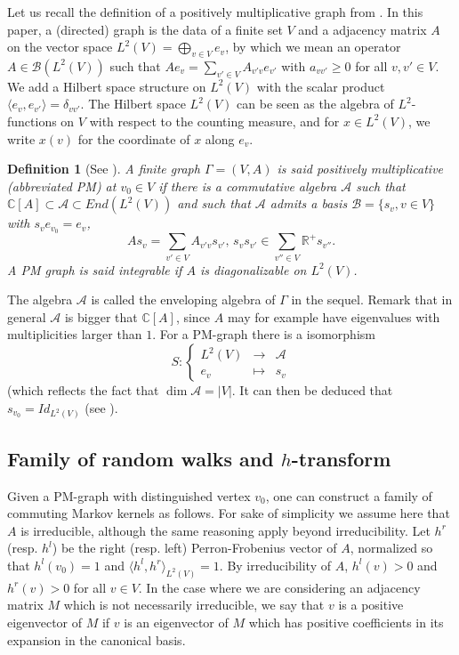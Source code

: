 \documentclass[10pt,11pt]{amsart}%
\newtheorem{definition}[theorem]{Definition}
\begin{document}
Let us recall the definition of a positively multiplicative graph from \cite{GLT}. In this paper, a (directed) graph is the data of a finite set $V$ and a adjacency matrix $A$ on the vector space $L^2(V)=\bigoplus_{v\in V} e_v$, by which we mean an operator $A\in\mathcal{B}(L^2(V))$ such that $Ae_v=\sum_{v'\in V}A_{v'v}e_{v'}$ with $a_{vv'}\geq 0$ for all $v,v'\in V$. We add a Hilbert space structure on $L^2(V)$ with the scalar product $\langle e_v,e_{v'}\rangle=\delta_{vv'}$. The Hilbert space $L^2(V)$ can be seen as the algebra of $L^2$-functions on $V$ with respect to the counting measure, and for $x\in L^2(V)$, we write $x(v)$ for the coordinate of $x$ along $e_v$.
\begin{definition} [See \cite{GLT}]\label{def:PM-graph}
A finite graph $\Gamma=(V,A)$ is said positively multiplicative (abbreviated PM) at $v_0\in V$ if there is a commutative algebra $\mathcal{A}$ such that $\mathbb{C}[A]\subset \mathcal{A}\subset End(L^2(V))$ and such that $\mathcal{A}$ admits a basis $\mathcal{B}=\{s_v,v\in V\}$ with $s_{v}e_{v_0}=e_v$,
$$As_v=\sum_{v'\in V}A_{v'v}s_{v'},\, s_vs_{v'}\in\sum_{v''\in V}\mathbb{R}^+s_{v''}.$$ 
A PM graph is said integrable if $A$ is diagonalizable on $L^2(V)$.
\end{definition}
The algebra $\mathcal{A}$ is called the enveloping algebra of $\Gamma$ in the sequel. Remark that in general $\mathcal{A}$ is bigger that $\mathbb{C}[A]$, since $A$ may for example have eigenvalues with multiplicities larger than $1$. For a PM-graph there is a isomorphism 
\begin{equation}\label{eq:isomor_L2_CA}
S:\left\lbrace \begin{aligned} L^2(V)&\rightarrow &\mathcal{A}\\ e_v&\mapsto &s_v\end{aligned}\right.
\end{equation}
(which reflects the fact that $\dim \mathcal{A}=|V|$. It can then be deduced that $s_{v_0}=Id_{L^2(V)}$ (see \cite[Theorem 3.12]{GLT}). 
\subsection{Family of random walks and $h$-transform}
Given a PM-graph with distinguished vertex $v_0$, one can construct a family of commuting Markov kernels as follows. For sake of simplicity we assume here that $A$ is irreducible, although the same reasoning apply beyond irreducibility. Let $h^r$ (resp. $h^l$) be the right (resp. left) Perron-Frobenius vector of $A$, normalized so that $h^l(v_0)=1$ and $\langle h^l,h^r\rangle_{L^2(V)}=1$. By irreducibility of $A$, $h^l(v)>0$ and $h^r(v)>0$ for all $v\in V$. In the case where we are considering an adjacency matrix $M$ which is not necessarily irreducible, we say that $v$ is a positive eigenvector of $M$ if $v$ is an eigenvector of $M$ which has positive coefficients in its expansion in the canonical basis.
\end{document}
